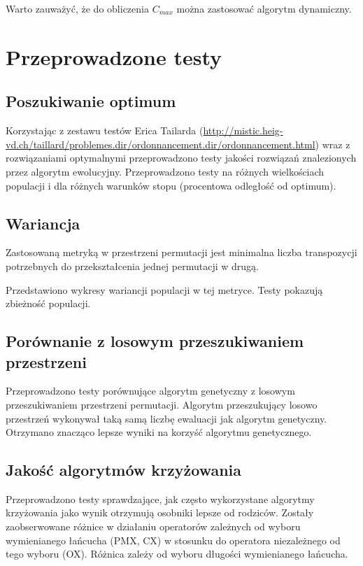 \documentclass[12pt]{article}
\begin{document}
Warto zauważyć, że do obliczenia $C_{max}$ można zastosować algorytm dynamiczny. 

\section{Przeprowadzone testy}
\subsection{Poszukiwanie optimum}

Korzystając z zestawu testów Erica Tailarda
(\url{http://mistic.heig-vd.ch/taillard/problemes.dir/ordonnancement.dir/ordonnancement.html})
wraz z rozwiązaniami optymalnymi przeprowadzono testy jakości
rozwiązań znalezionych przez algorytm ewolucyjny. Przeprowadzono testy
na różnych wielkościach populacji i dla różnych warunków stopu
(procentowa odległość od optimum).

\subsection{Wariancja}

Zastosowaną metryką w przestrzeni permutacji jest minimalna liczba
transpozycji potrzebnych do przekształcenia jednej permutacji w drugą.

Przedstawiono wykresy wariancji populacji w tej metryce. Testy
pokazują zbieżność populacji.

\subsection{Porównanie z losowym przeszukiwaniem przestrzeni}

Przeprowadzono testy porównujące algorytm genetyczny z losowym
przeszukiwaniem przestrzeni permutacji. Algorytm przeszukujący losowo
przestrzeń wykonywał taką samą liczbę ewaluacji jak algorytm
genetyczny. Otrzymano znacząco lepsze wyniki na korzyść algorytmu genetycznego.

\subsection{Jakość algorytmów krzyżowania}

Przeprowadzono testy sprawdzające, jak często wykorzystane algorytmy
krzyżowania jako wynik otrzymują osobniki lepsze od rodziców. Zostały
zaobserwowane różnice w działaniu operatorów zależnych od wyboru
wymienianego łańcucha (PMX, CX) w stosunku do operatora niezależnego
od tego wyboru (OX). Różnica zależy od wyboru długości wymienianego łańcucha.
\end{document}

